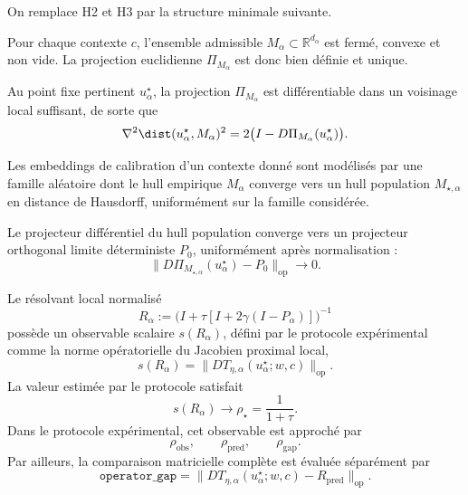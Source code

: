 On remplace H2 et H3 par la structure minimale suivante.

\begin{assumption}
Pour chaque contexte \(c\), l'ensemble admissible \(M_\alpha\subset\mathbb{R}^{d_\alpha}\) est fermé, convexe et non vide.
La projection euclidienne \(\Pi_{M_\alpha}\) est donc bien définie et unique.
\end{assumption}

\begin{assumption}
Au point fixe pertinent \(u_\alpha^\star\), la projection \(\Pi_{M_\alpha}\) est différentiable dans un voisinage local suffisant, de sorte que
\[
\nabla^2 \dist(u_\alpha^\star,M_\alpha)^2
=
2\bigl(I-D\Pi_{M_\alpha}(u_\alpha^\star)\bigr).
\]
\end{assumption}

\begin{assumption}
Les embeddings de calibration d'un contexte donné sont modélisés par une famille aléatoire dont le hull empirique \(M_\alpha\) converge vers un hull population \(M_{\star,\alpha}\) en distance de Hausdorff, uniformément sur la famille considérée.
\end{assumption}

\begin{assumption}
Le projecteur différentiel du hull population converge vers un projecteur orthogonal limite déterministe \(P_0\), uniformément après normalisation :
\[
\|D\Pi_{M_{\star,\alpha}}(u_\alpha^\star)-P_0\|_{\mathrm{op}}\to 0.
\]
\end{assumption}

\begin{assumption}
Le résolvant local normalisé
\[
R_\alpha:=\bigl(I+\tau[I+2\gamma(I-P_\alpha)]\bigr)^{-1}
\]
possède un observable scalaire \(s(R_\alpha)\), défini par le protocole expérimental comme la norme opératorielle du Jacobien proximal local,
\[
s(R_\alpha)=\|DT_{\eta,\alpha}(u_\alpha^\star;w,c)\|_{\mathrm{op}}.
\]
La valeur estimée par le protocole satisfait
\[
s(R_\alpha)\to \rho_\star=\frac{1}{1+\tau}.
\]
Dans le protocole expérimental, cet observable est approché par
\[
\rho_{\mathrm{obs}},\qquad \rho_{\mathrm{pred}},\qquad \rho_{\mathrm{gap}}.
\]
Par ailleurs, la comparaison matricielle complète est évaluée séparément par
\[
\texttt{operator\_gap}
=
\|DT_{\eta,\alpha}(u_\alpha^\star;w,c)-R_{\mathrm{pred}}\|_{\mathrm{op}}.
\]
\end{assumption}

